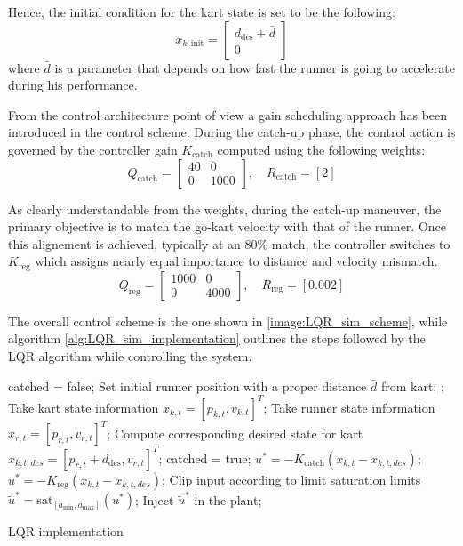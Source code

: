 \documentclass[a4paper,12pt,oneside]{book}
\begin{document}
Hence, the initial condition for the kart state is set to be the following:
\begin{equation}
    x_{k,\text{init}} =
    \begin{bmatrix}
        d_{\text{des}} + \bar{d} \\
        0
    \end{bmatrix}
\end{equation}
where $\bar{d}$ is a parameter that depends on how fast the runner is going to accelerate during his performance. 
 
\bigskip
From the control architecture point of view a gain scheduling approach has been introduced in the control scheme.
During the catch-up phase, the control action is governed by the controller gain $K_{\text{catch}}$ computed using the following weights: 
\begin{equation}
    Q_{\text{catch}} =
    \begin{bmatrix}
        40 & 0 \\
        0 & 1000
    \end{bmatrix},
    \quad
    R_{\text{catch}} = [2]
\end{equation}

As clearly understandable from the weights, during the catch-up maneuver, the primary objective is to match the go-kart velocity with  that of the runner.
Once this alignement is achieved, typically at an 80\% match, the controller switches to $K_{\text{reg}}$ which assigns nearly equal importance to distance and velocity mismatch.
\begin{equation}
    Q_{\text{reg}} =
    \begin{bmatrix}
        1000 & 0 \\
        0 & 4000
    \end{bmatrix},
    \quad
    R_{\text{reg}} = [0.002]
\end{equation}

The overall control scheme is the one shown in \ref{image:LQR_sim_scheme}, while algorithm \ref{alg:LQR_sim_implementation} outlines the steps followed by the LQR algorithm while controlling the system.
\begin{algorithm}
\begin{algorithmic}[1]
	\State catched = false;
	\State Set initial runner position with a proper distance $\bar{d}$ from kart;
	;
		\State Take kart state information $x_{k,t} = [p_{k,t}, v_{k,t}]^T$;
		\State Take runner state information $x_{r,t} = [p_{r,t}, v_{r,t}]^T$;
		\State Compute corresponding desired state for kart $x_{k,t,des} = [p_{r,t} + d_{\text{des}}, v_{r,t}]^T$;
			\State catched = true;
		\EndIf
			\State $u^* = - K_{\text{catch}} (x_{k,t} - x_{k,t,des}) $;
		\Else 
			\State $u^* = - K_{\text{reg}} (x_{k,t} - x_{k,t,des}) $;
		\EndIf
		\State Clip input according to limit saturation limits $\tilde{u}^* = \text{sat}_{[a_{\min}, a_{\max}]} (u^*)$;
		\State Inject $\tilde{u}^*$ in the plant;
	\EndFor
\caption{LQR implementation}
\label{alg:LQR_sim_implementation}
\end{algorithmic}
\end{algorithm}
\end{document}
